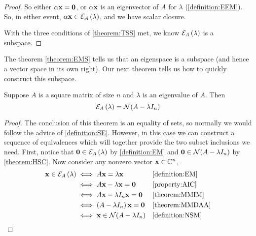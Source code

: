 \documentclass{ximera}
\begin{document}
\begin{theorem}
\begin{proof}
  So either $\alpha\mathbf{x}=\mathbf{0}$, or $\alpha\mathbf{x}$ is an
  eigenvector of $A$ for $\lambda$ (\ref{definition:EEM}).  So, in
  either event, $\alpha\mathbf{x}\in\mathcal{E}_{A}\left(\lambda\right)$, and we
  have scalar closure.

  With the three conditions of \ref{theorem:TSS} met, we know
  $\mathcal{E}_{A}\left(\lambda\right)$ is a subspace.
\end{proof}
\end{theorem}

The theorem \ref{theorem:EMS} tells us that an eigenspace is a
subspace (and hence a vector space in its own right).  Our next
theorem tells us how to quickly construct this subspace.

\begin{theorem}
  \label{theorem:EMNS}

  Suppose $A$ is a square matrix of size $n$ and $\lambda$ is an
  eigenvalue of $A$.  Then
  \[
    \mathcal{E}_{A}\left(\lambda\right)=\mathcal{N}\!\left(A-\lambda I_n\right)
  \]

  \begin{proof}
    The conclusion of this theorem is an equality of sets, so normally
    we would follow the advice of \ref{definition:SE}.  However, in
    this case we can construct a sequence of equivalences which will
    together provide the two subset inclusions we need.  First, notice
    that $\mathbf{0}\in\mathcal{E}_{A}\left(\lambda\right)$ by
    \ref{definition:EM} and $\mathbf{0}\in\mathcal{N}\!\left(A-\lambda I_n\right)$ by
    \ref{theorem:HSC}.  Now consider any nonzero vector
    $\mathbf{x}\in\mathbb{C}^{n}$,
    \begin{align*}
      \mathbf{x}\in\mathcal{E}_{A}\left(\lambda\right)&\iff A\mathbf{x}=\lambda\mathbf{x}&&\ref{definition:EM}\\
                                        &\iff A\mathbf{x}-\lambda\mathbf{x}=\mathbf{0}&&\ref{property:AIC}\\
                                        &\iff A\mathbf{x}-\lambda I_n\mathbf{x}=\mathbf{0}&&\ref{theorem:MMIM}\\
                                        &\iff\left(A-\lambda I_n\right)\mathbf{x}=\mathbf{0}&&\ref{theorem:MMDAA}\\
                                        &\iff\mathbf{x}\in\mathcal{N}\!\left(A-\lambda I_n\right)&&\ref{definition:NSM}
    \end{align*}

  \end{proof}
\end{theorem}
\end{document}
